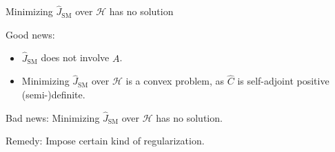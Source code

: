 \documentclass[aspectratio=169,xcolor=dvipsnames]{beamer}
\DeclareMathOperator*{\argmin}{arg\,min}
\newcommand{\SM}{\mathrm{SM}}
\newcommand{\calH}{\mathcal{H}}
\begin{document}
\begin{frame}{Minimizing $\widehat{J}_{\SM}$ over $\mathcal{H}$ has no solution}
	
	{\color{defaultcolor} Good news:} 
	\begin{itemize}
		\vspace{5pt}
		\item $\widehat{J}_{\SM}$ does {\color{red} not} involve $A$. 
		\vspace{5pt}
		\item Minimizing $\widehat{J}_{\SM}$ over $\mathcal{H}$ is a convex problem, as $\widehat{C}$ is self-adjoint positive (semi-)definite. 
	\end{itemize}
	
	\vspace{10pt}
	
	{\color{defaultcolor} Bad news:} Minimizing $\widehat{J}_{\SM}$ over $\calH$ has {\color{red}no solution}. 
		
	
	\vspace{10pt}
	
	{\color{defaultcolor} Remedy:} Impose certain kind of {\color{red} regularization}. 

\end{frame}
\end{document}
